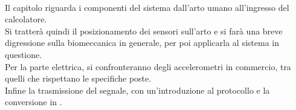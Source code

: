 {\bfseries
\vspace{1in}

\paragraph{}
Il capitolo riguarda i componenti del sistema
dall'arto umano
all'ingresso del calcolatore. 
\\

Si tratter\`a quindi il posizionamento dei sensori sull'arto
e si far\`a una breve digressione sulla biomeccanica in generale,
per poi applicarla al sistema in questione.
\\

Per la parte elettrica, si confronteranno degli accelerometri
in commercio, tra quelli che rispettano le specifiche poste.
\\

Infine la trasmissione del segnale, con un'introduzione al protocollo \iic e la conversione in \usb.

\vfill
}